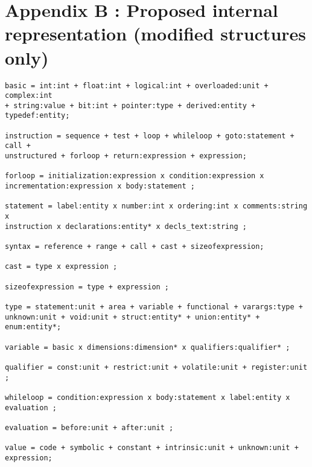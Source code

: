 \documentclass[a4paper]{article}
\begin{document}
\section{Appendix B : Proposed internal representation (modified structures only)}
\begin{verbatim}
basic = int:int + float:int + logical:int + overloaded:unit + complex:int 
+ string:value + bit:int + pointer:type + derived:entity + typedef:entity;

instruction = sequence + test + loop + whileloop + goto:statement + call +
unstructured + forloop + return:expression + expression;

forloop = initialization:expression x condition:expression x
incrementation:expression x body:statement ;

statement = label:entity x number:int x ordering:int x comments:string x
instruction x declarations:entity* x decls_text:string ;

syntax = reference + range + call + cast + sizeofexpression;

cast = type x expression ;

sizeofexpression = type + expression ;

type = statement:unit + area + variable + functional + varargs:type +
unknown:unit + void:unit + struct:entity* + union:entity* + enum:entity*;

variable = basic x dimensions:dimension* x qualifiers:qualifier* ;

qualifier = const:unit + restrict:unit + volatile:unit + register:unit ;

whileloop = condition:expression x body:statement x label:entity x
evaluation ;

evaluation = before:unit + after:unit ;

value = code + symbolic + constant + intrinsic:unit + unknown:unit + expression;
\end{verbatim}
\newpage


\end{document}
